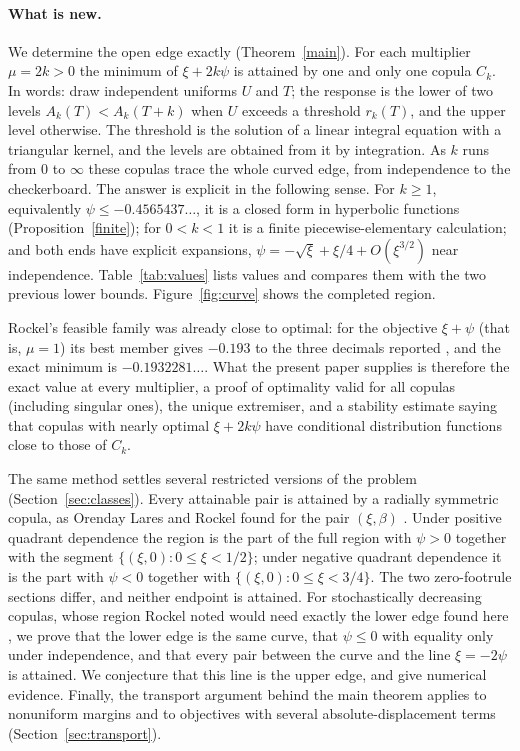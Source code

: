 \documentclass[11pt,a4paper]{article}
\theoremstyle{remark}
\newcommand{\1}{\mathbf 1}
\begin{document}
\paragraph{What is new.} We determine the open edge exactly (Theorem~\ref{main}). For each multiplier $\mu=2k>0$ the minimum of $\xi+2k\psi$ is attained by one and only one copula $C_k$. In words: draw independent uniforms $U$ and $T$; the response is the lower of two levels $A_k(T)<A_k(T+k)$ when $U$ exceeds a threshold $r_k(T)$, and the upper level otherwise. The threshold is the solution of a linear integral equation with a triangular kernel, and the levels are obtained from it by integration. As $k$ runs from $0$ to $\infty$ these copulas trace the whole curved edge, from independence to the checkerboard. The answer is explicit in the following sense. For $k\ge1$, equivalently $\psi\le-0.4565437\ldots$, it is a closed form in hyperbolic functions (Proposition~\ref{finite}); for $0<k<1$ it is a finite piecewise-elementary calculation; and both ends have explicit expansions, $\psi=-\sqrt\xi+\xi/4+O(\xi^{3/2})$ near independence. Table~\ref{tab:values} lists values and compares them with the two previous lower bounds. Figure~\ref{fig:curve} shows the completed region.

Rockel's feasible family was already close to optimal: for the objective $\xi+\psi$ (that is, $\mu=1$) its best member gives $-0.193$ to the three decimals reported \cite[Table~2]{rockel}, and the exact minimum is $-0.1932281\ldots$. What the present paper supplies is therefore the exact value at every multiplier, a proof of optimality valid for all copulas (including singular ones), the unique extremiser, and a stability estimate saying that copulas with nearly optimal $\xi+2k\psi$ have conditional distribution functions close to those of $C_k$.

The same method settles several restricted versions of the problem (Section~\ref{sec:classes}). Every attainable pair is attained by a radially symmetric copula, as Orenday Lares and Rockel found for the pair $(\xi,\beta)$ \cite{olr}. Under positive quadrant dependence the region is the part of the full region with $\psi>0$ together with the segment $\{(\xi,0):0\le\xi<1/2\}$; under negative quadrant dependence it is the part with $\psi<0$ together with $\{(\xi,0):0\le\xi<3/4\}$. The two zero-footrule sections differ, and neither endpoint is attained. For stochastically decreasing copulas, whose region Rockel noted would need exactly the lower edge found here \cite[Remark~2(e)]{rockel}, we prove that the lower edge is the same curve, that $\psi\le0$ with equality only under independence, and that every pair between the curve and the line $\xi=-2\psi$ is attained. We conjecture that this line is the upper edge, and give numerical evidence. Finally, the transport argument behind the main theorem applies to nonuniform margins and to objectives with several absolute-displacement terms (Section~\ref{sec:transport}).
\end{document}
